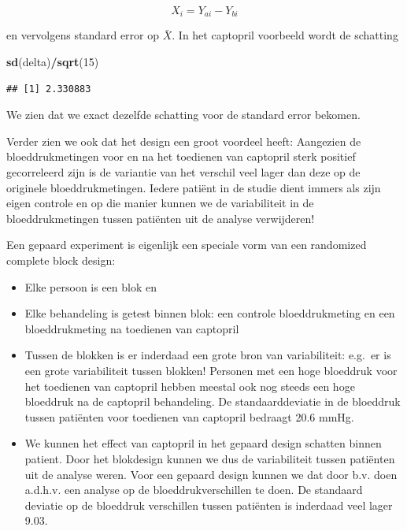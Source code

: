\documentclass[
  12pt,dutch]{book}
\newenvironment{Shaded}{\begin{snugshade}}{\end{snugshade}}
\newcommand{\DecValTok}[1]{\textcolor[rgb]{0.00,0.00,0.81}{#1}}
\newcommand{\FunctionTok}[1]{\textcolor[rgb]{0.13,0.29,0.53}{\textbf{#1}}}
\newcommand{\NormalTok}[1]{#1}
\newcommand{\SpecialCharTok}[1]{\textcolor[rgb]{0.81,0.36,0.00}{\textbf{#1}}}
\theoremstyle{definition}
\theoremstyle{definition}
\theoremstyle{definition}
\theoremstyle{definition}
\theoremstyle{remark}
\begin{document}
\[X_{i}=Y_{ai}-Y_{bi}\]

en vervolgens standard error op \(\bar X\).
In het captopril voorbeeld wordt de schatting

\begin{Shaded}
\begin{Highlighting}[]
\FunctionTok{sd}\NormalTok{(delta)}\SpecialCharTok{/}\FunctionTok{sqrt}\NormalTok{(}\DecValTok{15}\NormalTok{)}
\end{Highlighting}
\end{Shaded}

\begin{verbatim}
## [1] 2.330883
\end{verbatim}

We zien dat we exact dezelfde schatting voor de standard error bekomen.

Verder zien we ook dat het design een groot voordeel heeft:
Aangezien de bloeddrukmetingen voor en na het toedienen van captopril sterk positief gecorreleerd zijn is de variantie van het verschil veel lager dan deze op de originele bloeddrukmetingen.
Iedere patiënt in de studie dient immers als zijn eigen controle en op die manier kunnen we de variabiliteit in de bloeddrukmetingen tussen patiënten uit de analyse verwijderen!

Een gepaard experiment is eigenlijk een speciale vorm van een randomized complete block design:

\begin{itemize}
\item
  Elke persoon is een blok en
\item
  Elke behandeling is getest binnen blok: een controle bloeddrukmeting en een bloeddrukmeting na toedienen van captopril
\item
  Tussen de blokken is er inderdaad een grote bron van variabiliteit: e.g.~er is een grote variabiliteit tussen blokken! Personen met een hoge bloeddruk voor het toedienen van captopril hebben meestal ook nog steeds een hoge bloeddruk na de captopril behandeling. De standaarddeviatie in de bloeddruk tussen patiënten voor toedienen van captopril bedraagt 20.6 mmHg.
\item
  We kunnen het effect van captopril in het gepaard design schatten binnen patient. Door het blokdesign kunnen we dus de variabiliteit tussen patiënten uit de analyse weren. Voor een gepaard design kunnen we dat door b.v. doen a.d.h.v. een analyse op de bloeddrukverschillen te doen. De standaard deviatie op de bloeddruk verschillen tussen patiënten is inderdaad veel lager 9.03.
\end{itemize}
\end{document}
